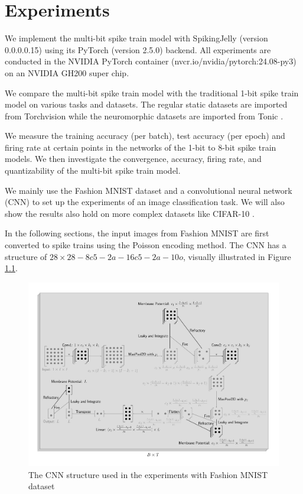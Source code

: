 \chapter{Experiments}
\label{chap:experiments}
We implement the multi-bit spike train model with SpikingJelly \cite{doi:10.1126/sciadv.adi1480} (version 0.0.0.0.15) using its PyTorch \cite{NEURIPS2019_9015} (version 2.5.0) backend. All experiments are conducted in the NVIDIA PyTorch container (nvcr.io/nvidia/pytorch:24.08-py3) on an NVIDIA GH200 super chip. 

We compare the multi-bit spike train model with the traditional 1-bit spike train model on various tasks and datasets. The regular static datasets are imported from Torchvision \cite{10.1145/1873951.1874254} while the neuromorphic datasets are imported from Tonic \cite{lenz_2021_5079802}. 

We measure the training accuracy (per batch), test accuracy (per epoch) and firing rate at certain points in the networks of the 1-bit to 8-bit spike train models. We then investigate the convergence, accuracy, firing rate, and quantizability of the multi-bit spike train model. 


We mainly use the Fashion MNIST dataset \cite{xiao2017/online} and a convolutional neural network (CNN) \cite{726791} to set up the experiments of an image classification task. We will also show the results also hold on more complex datasets like CIFAR-10 \cite{Krizhevsky2009}. 

In the following sections, the input images from Fashion MNIST are first converted to spike trains using the Poisson encoding method. The CNN has a structure of $28\times 28 - 8c5 - 2a - 16c5 - 2a - 10o$, visually illustrated in Figure \ref{fig:scnn_structure}. 

\begin{figure}[!htpb]
    \centering
    \includegraphics[width=\textwidth]{assets/standard/FashionMNIST/snn2.pdf}
    \caption{The CNN structure used in the experiments with Fashion MNIST dataset}
    \label{fig:scnn_structure}
\end{figure}

